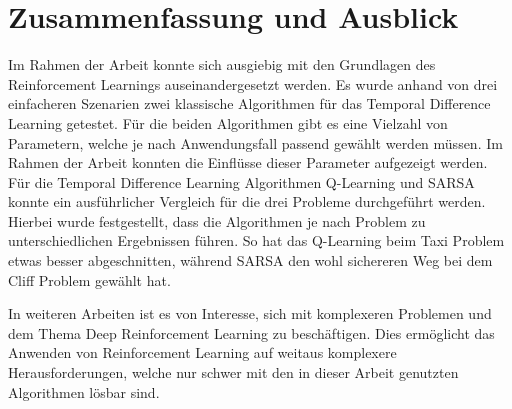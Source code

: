 \section{Zusammenfassung und Ausblick}

Im Rahmen der Arbeit konnte sich ausgiebig mit den Grundlagen des Reinforcement Learnings auseinandergesetzt werden. Es wurde anhand von drei einfacheren Szenarien zwei klassische Algorithmen für das Temporal Difference Learning getestet.
Für die beiden Algorithmen gibt es eine Vielzahl von Parametern, welche je nach Anwendungsfall passend gewählt werden müssen. Im Rahmen der Arbeit konnten die Einflüsse dieser Parameter aufgezeigt werden. Für die Temporal Difference Learning Algorithmen Q-Learning und SARSA konnte ein ausführlicher Vergleich für die drei Probleme durchgeführt werden.
Hierbei wurde festgestellt, dass die Algorithmen je nach Problem zu unterschiedlichen Ergebnissen führen. So hat das Q-Learning beim Taxi Problem etwas besser abgeschnitten, während SARSA den wohl sichereren Weg bei dem Cliff Problem gewählt hat. 

In weiteren Arbeiten ist es von Interesse, sich mit komplexeren Problemen und dem Thema Deep Reinforcement Learning zu beschäftigen. Dies ermöglicht das Anwenden von Reinforcement Learning auf weitaus komplexere Herausforderungen, welche nur schwer mit den in dieser Arbeit genutzten Algorithmen lösbar sind.
